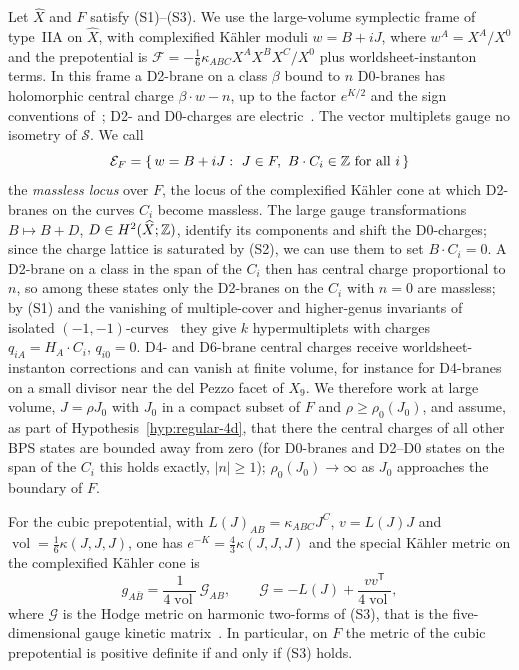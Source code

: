Let $\widehat X$ and $F$ satisfy (S1)--(S3). We use the large-volume symplectic frame of type~IIA on
$\widehat X$, with complexified K\"ahler moduli $w=B+iJ$, where $w^A=X^A/X^0$ and the prepotential is
$\mathcal F=-\tfrac16\kappa_{ABC}X^AX^BX^C/X^0$ plus worldsheet-instanton terms. In this frame a D2-brane on a class
$\beta$ bound to $n$ D0-branes has holomorphic central charge $\beta\cdot w-n$, up to the factor $e^{K/2}$
and the sign conventions of~\cite[eq.~(A.10)]{Denef:2007Halos}; D2- and D0-charges are
electric~\cite{Denef:2007Halos}. The vector multiplets gauge no isometry of $\mathcal S$. We call
\[
 \mathcal E_F=\{\,w=B+iJ:\ J\in F,\ B\cdot C_i\in\ZZ\ \text{for all }i\,\}
\]
the \emph{massless locus} over $F$, the locus of the complexified K\"ahler cone at which D2-branes on the
curves $C_i$ become massless. The large gauge transformations $B\mapsto B+D$, $D\in H^2(\widehat X;\mathbb Z)$,
identify its components and shift the D0-charges; since the charge lattice is saturated by (S2), we can
use them to set $B\cdot C_i=0$. A D2-brane on a class
in the span of the $C_i$ then has central charge proportional to $n$, so among these states only the
D2-branes on the $C_i$ with $n=0$ are massless; by (S1) and the vanishing of multiple-cover and
higher-genus invariants of isolated $(-1,-1)$-curves~\cite{FaberPandharipande:2000,BryanKatzLeung:2001}
they give $k$ hypermultiplets with charges $q_{iA}=H_A\cdot C_i$, $q_{i0}=0$. D4- and D6-brane central
charges receive worldsheet-instanton corrections and can vanish at finite volume, for instance for
D4-branes on a small divisor near the del Pezzo facet of $X_9$. We therefore work at large volume,
$J=\rho J_0$ with $J_0$ in a compact subset of $F$ and $\rho\geq\rho_0(J_0)$, and assume, as part of
Hypothesis~\ref{hyp:regular-4d}, that there the central charges of all other BPS states are bounded away
from zero (for D0-branes and D2--D0 states on the span of the $C_i$ this holds exactly, $|n|\geq1$);
$\rho_0(J_0)\to\infty$ as $J_0$ approaches the boundary of $F$.

\begin{proposition}\label{prop:4d-kinetic}
For the cubic prepotential, with $L(J)_{AB}=\kappa_{ABC}J^C$, $v=L(J)J$ and $\operatorname{vol}=\tfrac16\kappa(J,J,J)$,
one has $e^{-K}=\tfrac43\kappa(J,J,J)$ and the special K\"ahler metric on the complexified K\"ahler cone is
\begin{equation}
 g_{A\bar B}=\frac{1}{4\operatorname{vol}}\,\mathcal G_{AB},\qquad
 \mathcal G=-L(J)+\frac{vv^{\mathsf T}}{4\operatorname{vol}},
 \label{eq:4d-kinetic}
\end{equation}
where $\mathcal G$ is the Hodge metric on harmonic two-forms of (S3), that is the five-dimensional gauge
kinetic matrix~\cite[eqs.~(4.1), (4.6)]{W26quantum}. In particular, on $F$ the metric of the cubic
prepotential is positive definite if and only if (S3) holds.
\end{proposition}

